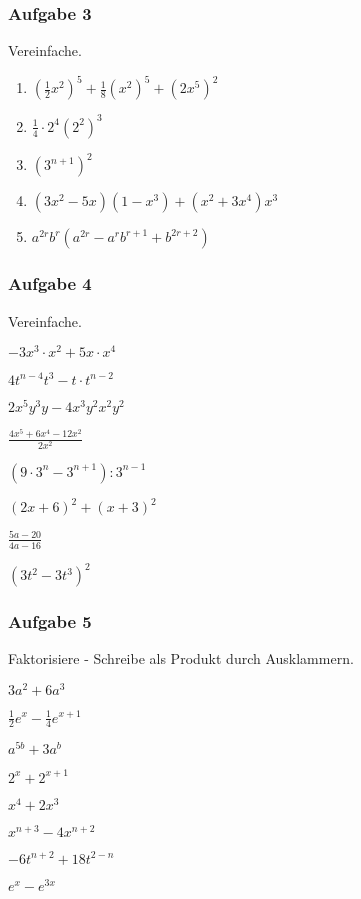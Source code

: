 \subsubsection{Aufgabe 3}
Vereinfache.
\begin{enumerate}
	\item \quad $ \left(\frac{1}{2}x^2\right)^5 + \frac{1}{8}(x^2)^5 + (2x^5)^2 $
	\item \quad $ \frac{1}{4} \cdot 2^4(2^2)^3 $
	\item \quad $ (3^{n+1})^2 $
	\item \quad $ (3x^2 - 5x)(1-x^3) + (x^2 + 3x^4)x^3 $
	\item \quad $ a^{2r}b^r(a^{2r} - a^rb^{r+1} + b^{2r+2}) $
\end{enumerate}

\subsubsection{Aufgabe 4}
Vereinfache.
\begin{enumerate}
\begin{multicols}{2}
	\item \quad $ -3x^3 \cdot x^2 + 5x \cdot x^4 $
	\item \quad $ 4t^{n-4}t^3-t \cdot t^{n-2} $
	\item \quad $ 2x^5y^3y - 4x^3y^2x^2y^2 $
	\item \quad $ \frac{4x^5 + 6x^4 -12x^2}{2x^2} $
	\item \quad $ (9 \cdot 3^n - 3^{n+1}) : 3^{n-1} $
	\item \quad $ (2x+6)^2+(x+3)^2 $
	\item \quad $ \frac{5a-20}{4a-16} $
	\item \quad $ (3t^2 - 3t^3)^2 $
\end{multicols}
\end{enumerate}

\newpage

\subsubsection{Aufgabe 5}
Faktorisiere - Schreibe als Produkt durch Ausklammern.
\begin{enumerate}
\begin{multicols}{2}
	\item \quad $ 3a^2 + 6a^3 $
	\item \quad $ \frac{1}{2}e^x - \frac{1}{4}e^{x+1} $
	\item \quad $ a^{5b} + 3a^b $
	\item \quad $ 2^x + 2^{x+1} $
	\item \quad $ x^4+2x^3 $
	\item \quad $ x^{n+3} - 4x^{n+2} $
	\item \quad $ -6t^{n+2}+18t^{2-n} $
	\item \quad $ e^x-e^{3x} $
\end{multicols}
\end{enumerate}

